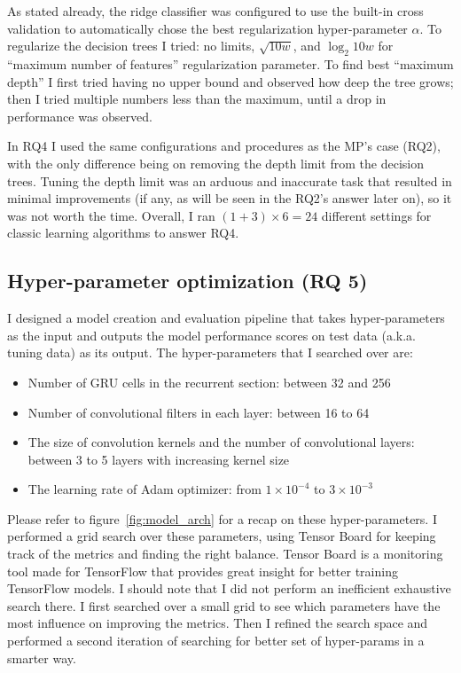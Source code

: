 As stated already, the ridge classifier was configured to use the built-in cross validation to automatically chose the best regularization hyper-parameter $\alpha$.
To regularize the decision trees I tried: no limits, $\sqrt{10w}$, and $\log_2{10w}$ for ``maximum number of features'' regularization parameter. To find best ``maximum depth'' I first tried having no upper bound and observed how deep the tree grows; then I tried multiple numbers less than the maximum, until a drop in performance was observed. 

In RQ4 I used the same configurations and procedures as the MP's case (RQ2), with the only difference being on removing the depth limit from the decision trees. Tuning the depth limit was an arduous and inaccurate task that resulted in minimal improvements (if any, as will be seen in the RQ2's answer later on), so it was not worth the time. Overall, I ran $(1+3)\times6=24$ different settings for classic learning algorithms to answer RQ4. 

\subsection{Hyper-parameter optimization (RQ 5)}
I designed a model creation and evaluation pipeline that takes hyper-parameters as the input and outputs the model performance scores on test data (a.k.a. tuning data) as its output. The hyper-parameters that I searched over are:
\begin{itemize}
    \item Number of GRU cells in the recurrent section: between 32 and 256
    \item Number of convolutional filters in each layer: between 16 to 64
    \item The size of convolution kernels and the number of convolutional layers: between 3 to 5 layers with increasing kernel size
    \item The learning rate of Adam optimizer: from $1\times 10^{-4}$ to $3\times10^{-3}$
\end{itemize}
Please refer to figure~\ref{fig:model_arch} for a recap on these hyper-parameters. 
I performed a grid search over these parameters, using Tensor Board for keeping track of the metrics and finding the right balance. 
Tensor Board is a monitoring tool made for TensorFlow that provides great insight for better training TensorFlow models.
I should note that I did not perform an inefficient exhaustive search there. I first searched over a small grid to see which parameters have the most influence on improving the metrics. Then I refined the search space and performed a second iteration of searching for better set of hyper-params in a smarter way.

